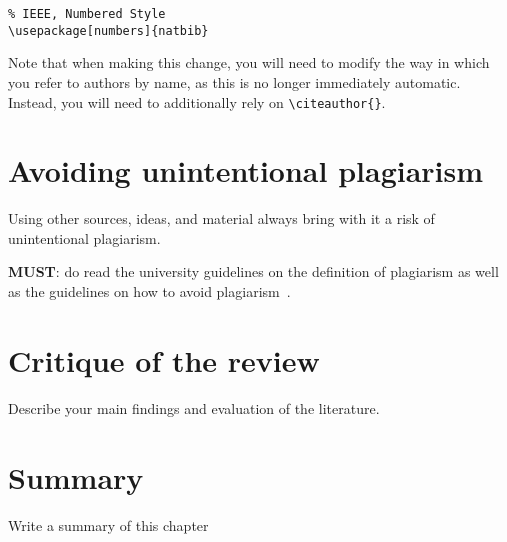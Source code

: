 \begin{verbatim}
% IEEE, Numbered Style
\usepackage[numbers]{natbib}

\end{verbatim}

Note that when making this change, you will need to modify the way in which you refer to authors by name, as this is no longer immediately automatic.  Instead, you will need to additionally rely on \verb|\citeauthor{}|.


\section{Avoiding unintentional plagiarism}
Using other sources, ideas, and material always bring with it a risk of unintentional plagiarism. 

\noindent
\textbf{\color{red}MUST}: do read the university guidelines on the definition of plagiarism as well as the guidelines on how to avoid plagiarism~\citep{uor_plagiarism}.




\section{Critique of the review} %
Describe your main findings and evaluation of the literature. ~\\

\section{Summary} 
Write a summary of this chapter~\\

